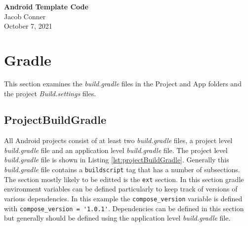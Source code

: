 \documentclass[12pt]{article}
\begin{document}
\begin{centering}
{\large\textbf{Android Template Code}}\\ %
Jacob Conner\\                     %
October 7, 2021\\                      %
\end{centering}

\tableofcontents

\section{Gradle}
This section examines the \textit{build.gradle} files in the Project and App folders and the project \textit{Build.settings} files. 
\newpage
\subsection{ProjectBuildGradle}

All Android projects consist of at least two \textit{build.gradle} files, a project level \textit{build.gradle} file and an application level \textit{build.gradle} file. The project level \textit{build.gradle} file is shown in Listing  \ref{lst:projectBuildGradle}. Generally this 
\textit{build.gradle} file contains a \verb|buildscript| tag that has a number of subsections. The section mostly likely to be 
editted is the \verb|ext| section. In this section gradle environment variables can be defined particularly to keep track 
of versions of various dependencies. In this example the \verb|compose_version| variable is defined with \verb|compose_version = '1.0.1'|. Dependencies can be defined in this section but generally should be defined using the application level \textit{build.gradle} file. 

\newpage
\end{document}
